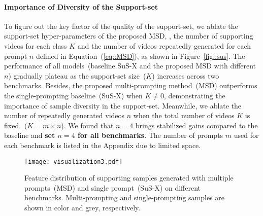 \paragraph{Importance of Diversity of the Support-set}
{
    To figure out the key factor of the quality of the support-set, we ablate the support-set hyper-parameters of the proposed MSD, \ie, the number of supporting videos for each class $K$ and the number of videos repeatedly generated for each prompt $n$ defined in Equation~(\ref{eq::MSD}), as shown in Figure~\ref{fig::sus}.    
    The performance of all models~(baseline SuS-X and the proposed MSD with different $n$) gradually plateau as the support-set size~($K$) increases across two benchmarks. 
    Besides, the proposed multi-prompting method~(MSD) outperforms the single-prompting baseline~(SuS-X) when $K \neq 0$, demonstrating the importance of sample diversity in the support-set. 
    Meanwhile, we ablate the number of repeatedly generated videos $n$ when the total number of videos $K$ is fixed.~($K= m \times n$). We found that $n=4$ brings stabilized gains compared to the baseline and \textbf{set $n=4$ for all benchmarks}. The number of prompts $m$ used for each benchmark is listed in the Appendix due to limited space.
}
\begin{figure*}[ht]
  \centering
  \texttt{[image: visualization3.pdf]}  
  \caption{Feature distribution of supporting samples generated with multiple prompts~(MSD) and single prompt~(SuS-X) on different benchmarks. Multi-prompting and single-prompting samples are shown in color and grey, respectively.}\label{fig::vis-MSD}
\end{figure*}

